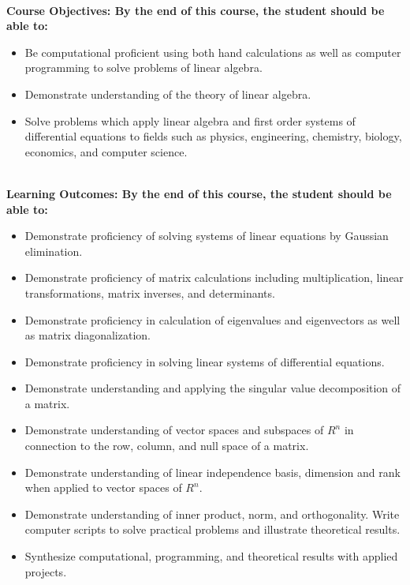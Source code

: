 \documentclass [11pt]{article}
\begin{document}
\ \\
\bfseries Course Objectives: \normalfont By the end of this course, the student should be able to:
\begin {itemize}
\setlength{\itemsep}{1pt}
\setlength{\parskip}{0pt}
\setlength{\parsep}{0pt}
\item Be computational proficient using both hand calculations as well as computer programming to solve problems of linear algebra.
\item Demonstrate understanding of the theory of linear algebra.
\item Solve problems which apply linear algebra and first order systems of differential equations to fields such as physics, engineering, chemistry, biology, economics, and computer science.
\end{itemize}
\ \\
\bfseries Learning Outcomes: \normalfont By the end of this course, the student should be able to:
\begin {itemize}
\setlength{\itemsep}{1pt}
\setlength{\parskip}{0pt}
\setlength{\parsep}{0pt}
\item Demonstrate proficiency of solving systems of linear equations by Gaussian elimination. 
\item Demonstrate proficiency of matrix calculations including multiplication, linear transformations, matrix inverses, and determinants.
\item Demonstrate proficiency in calculation of eigenvalues and eigenvectors as well as matrix diagonalization.
\item Demonstrate proficiency in solving linear systems of differential equations.
\item Demonstrate understanding and applying the singular value decomposition of a matrix.
\item Demonstrate understanding of vector spaces and subspaces of $R^n$ in connection to the row, column, and null space of a matrix.
\item Demonstrate understanding of linear independence basis, dimension and rank when applied to vector spaces of $R^n$.
\item Demonstrate understanding of inner product, norm, and orthogonality.
Write computer scripts to solve practical problems and illustrate theoretical results.
\item Synthesize computational, programming, and theoretical results with applied projects.
\end{itemize}
\pagebreak
\end{document}
